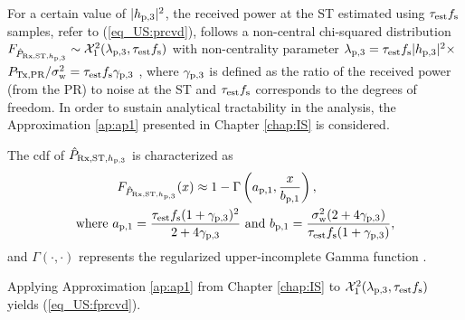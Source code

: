 For a certain value of $|h_{\text{p,3}}|^2$, the received power at the ST estimated using $\tau_{\text{est}} f_{\text{s}}$ samples, refer to (\ref{eq_US:prcvd}), follows a non-central chi-squared distribution $\fprcvdstpr \sim \ncchi2(\lpth, \test \fsam)$ with non-centrality parameter $\lambda_{\text{p,3}} = \tau_{\text{est}} f_{\text{s}} |h_{\text{p,3}}|^2 \times$ $P_{\text{Tx,PR}} /\sigma^2_{\text{w}} = \tau_{\text{est}} f_{\text{s}} {\gamma}_{\text{p,3}}$ \cite{Kay}, where ${\gamma}_{\text{p,3}}$ is defined as the ratio of the received power (from the PR) to noise at the ST and $\tau_{\text{est}} f_{\text{s}}$ corresponds to the degrees of freedom. In order to sustain analytical tractability in the analysis, the Approximation \ref{ap:ap1} presented in Chapter \ref{chap:IS} is considered. 
\begin{lemma} \label{lm_US:lm1}
\normalfont
The cdf of $\hat{P}_{\text{Rx,ST,$h_{\text{p,3}}$}}$ is characterized as 
\begin{align}
F_{\hat{P}_{\text{Rx,ST,$h_{\text{p,3}}$}}}(x) \approx 1 - \Gamma&\left(a_{\text{p,1}}, \frac{x}{b_{\text{p,1}}}\right) \label{eq_US:fprcvd}, \\ 
\text{where  } a_{\text{p,1}} = \frac{\tau_{\text{est}} f_{\text{s}} (1 + {\gamma}_{\text{p,3}})^2}{2 + 4 {\gamma}_{\text{p,3}}} &\text{ and } b_{\text{p,1}} = \frac{\sigma^2_{\text{w}} (2 + 4 {\gamma}_{\text{p,3}})}{\tau_{\text{est}} f_{\text{s}} (1 + {\gamma}_{\text{p,3}})},  \label{eq_US:para_po} 
\end{align} 
and $\Gamma(\cdot, \cdot)$ represents the regularized upper-incomplete Gamma function \cite{abramo}. 
\end{lemma}
\begin{IEEEproof}
Applying Approximation \ref{ap:ap1} from Chapter \ref{chap:IS} to $\ncchi2(\lpth, \test \fsam)$ yields (\ref{eq_US:fprcvd}). 
\end{IEEEproof}

